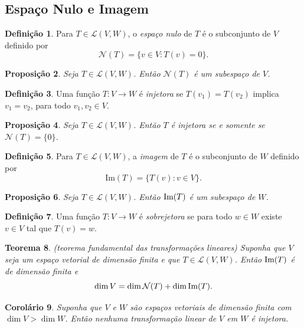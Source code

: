 \documentclass[12pt]{article}
\theoremstyle{plain}
\newtheorem{thm}{Teorema}[section]
\newtheorem{prop}[thm]{Proposição}
\newtheorem{cor}[thm]{Corolário}
\theoremstyle{definition}
\newtheorem{defn}[thm]{Definição}
\theoremstyle{remark}
\begin{document}
\subsection{Espaço Nulo e Imagem}
\begin{defn}
    Para \(T \in \mathcal{L}(V, W)\), o \emph{espaço nulo} de \(T\) é o subconjunto de \(V\) definido por
    \[
        \mathcal{N}(T) = \{v \in V : T(v) = 0\}.
    \]
\end{defn}

\begin{prop}
    Seja \(T \in \mathcal{L}(V, W)\). Então \(\mathcal{N}(T)\) é um subespaço de \(V\).
\end{prop}

\begin{defn}
    Uma função \(T: V \to W\) é \emph{injetora} se \(T(v_1) = T(v_2)\) implica \(v_1 = v_2\), para todo \(v_1, v_2 \in V\).
\end{defn}

\begin{prop}
    Seja \(T \in \mathcal{L}(V, W)\). Então \(T\) é injetora se e somente se \(\mathcal{N}(T) = \{0\}\).
\end{prop}

\begin{defn}
    Para \(T \in \mathcal{L}(V, W)\), a \emph{imagem} de \(T\) é o subconjunto de \(W\) definido por
    \[
        \text{Im}(T) = \{T(v) : v \in V\}.
    \]
\end{defn}

\begin{prop}
    Seja \(T \in \mathcal{L}(V, W)\). Então \(\textup{Im}(T)\) é um subespaço de \(W\).
\end{prop}

\begin{defn}
    Uma função \(T: V \to W\) é \emph{sobrejetora} se para todo \(w \in W\) existe \(v \in V\) tal que \(T(v) = w\).
\end{defn}

\begin{thm} (teorema fundamental das transformações lineares)
    Suponha que \(V\) seja um espaço vetorial de dimensão finita e que \(T \in \mathcal{L}(V, W)\). Então \(\textup{Im}(T)\) é de dimensão finita e
    \begin{equation}
        \dim V = \dim \mathcal{N}(T) + \dim \textup{Im}(T).
    \end{equation}
\end{thm}

\begin{cor}
    Suponha que \(V\) e \(W\) são espaços vetoriais de dimensão finita com \(\dim V > \dim W\). Então nenhuma transformação linear de \(V\) em \(W\) é injetora.
\end{cor}
\end{document}
